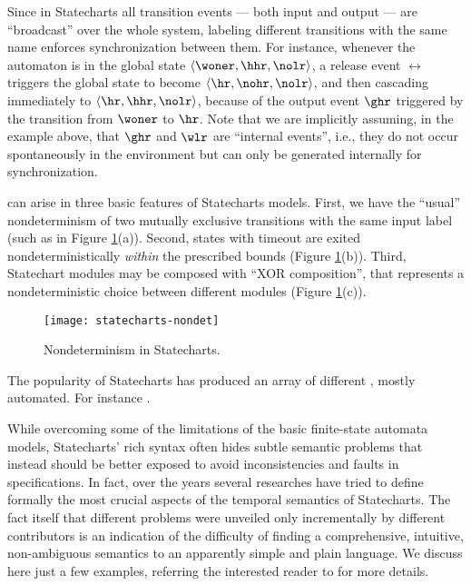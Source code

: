 Since in Statecharts all transition events --- both input and output 
--- are ``broadcast'' over the whole system, labeling different 
transitions with the same name enforces synchronization between 
them. For instance, whenever the automaton is in the global state $\langle \woner, \hhr, \nolr \rangle$, 
a release event $\rel$ triggers the global state to become $\langle \hr, \nohr, \nolr \rangle$, 
and then cascading immediately to $\langle \hr, \hhr, \nolr \rangle$, 
because of the output event $\ghr$ triggered by the transition 
from $\woner$ to $\hr$. Note that we are implicitly assuming, 
in the example above, that $\ghr$ and $\wlr$ are ``internal events'',
i.e., they do not occur spontaneously in the environment 
but can only be generated internally for synchronization.

 can arise in three basic features of Statecharts 
models. First, we have the ``usual'' nondeterminism of two mutually 
exclusive transitions with the same input label (such as in Figure \ref{fig:statecharts-nondet}(a)). 
Second, states with timeout are exited nondeterministically \emph{within} 
the prescribed bounds (Figure \ref{fig:statecharts-nondet}(b)). Third, Statechart modules 
may be composed with ``XOR composition'', that represents a nondeterministic 
choice between different modules (Figure \ref{fig:statecharts-nondet}(c)). 

\begin{figure}[htb!]
	 \centering
	 \texttt{[image: statecharts-nondet]}
	 \caption{Nondeterminism in Statecharts.}
	 \label{fig:statecharts-nondet}
\end{figure}

The popularity of Statecharts has produced an array of different 
, mostly automated. For instance \cite{HLNPPSST90,BDW00,GTBF03}.

While overcoming some of the limitations of the basic finite-state 
automata models, Statecharts' rich syntax often hides subtle semantic 
problems that instead should be better exposed to avoid inconsistencies 
and faults in specifications. In fact, over the years several 
researches have tried to define formally the most crucial aspects 
of the temporal semantics of Statecharts. The fact itself that 
different problems were unveiled only incrementally by different 
contributors is an indication of the difficulty of finding a 
comprehensive, intuitive, non-ambiguous semantics to an apparently 
simple and plain language. We discuss here just a few examples, 
referring the interested reader to \cite{HPSS87,PS91,vdB94,HN96} 
for more details.

